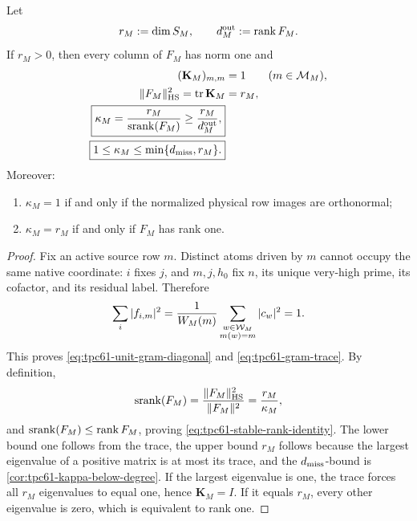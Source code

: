 \begin{theorem}
\label{thm:tpc61-stable-rank}
Let
\begin{equation}
 r_M:=\dim S_M,
 \qquad
 d_M^{\rm out}:=\operatorname{rank} F_M.
 \label{eq:tpc61-active-dimensions}
\end{equation}
If \(r_M>0\), then every column of \(F_M\) has norm one and
\begin{align}
 (\mathbf K_M)_{m,m}&=1
 \qquad(m\in\mathcal M_M),
 \label{eq:tpc61-unit-gram-diagonal}\\
 \|F_M\|_{\rm HS}^2
 =\operatorname{tr}\mathbf K_M&=r_M,
 \label{eq:tpc61-gram-trace}\\
 \boxed{
 \kappa_M
 =\frac{r_M}{\operatorname{srank}(F_M)}
 \ge\frac{r_M}{d_M^{\rm out}},}
 \label{eq:tpc61-stable-rank-identity}\\
 \boxed{
 1\le\kappa_M\le\min\{d_{\rm miss},r_M\}.}
 \label{eq:tpc61-kappa-basic-range}
\end{align}
Moreover:
\begin{enumerate}[label=\textup{(\roman*)},leftmargin=3em]
 \item \(\kappa_M=1\) if and only if the normalized physical row images
       are orthonormal;
 \item \(\kappa_M=r_M\) if and only if \(F_M\) has rank one.
\end{enumerate}
\end{theorem}

\begin{proof}
Fix an active source row \(m\).  Distinct atoms driven by \(m\) cannot
occupy the same native coordinate: \(i\) fixes \(j\), and \(m,j,h_0\) fix
\(n\), its unique very-high prime, its cofactor, and its residual label.
Therefore
\[
 \sum_i|f_{i,m}|^2
 =\frac{1}{W_M(m)}
   \sum_{\substack{w\in\mathcal W_M\\m(w)=m}}|c_w|^2
 =1.
\]
This proves \eqref{eq:tpc61-unit-gram-diagonal} and
\eqref{eq:tpc61-gram-trace}.  By definition,
\[
 \operatorname{srank}(F_M)
 =\frac{\|F_M\|_{\rm HS}^2}{\|F_M\|^2}
 =\frac{r_M}{\kappa_M},
\]
and \(\operatorname{srank}(F_M)\le\operatorname{rank} F_M\), proving
\eqref{eq:tpc61-stable-rank-identity}.  The lower bound one follows from
the trace, the upper bound \(r_M\) follows because the largest eigenvalue
of a positive matrix is at most its trace, and the
\(d_{\rm miss}\)-bound is
\cref{cor:tpc61-kappa-below-degree}.  If the largest eigenvalue is one,
the trace forces all \(r_M\) eigenvalues to equal one, hence
\(\mathbf K_M=I\).  If it equals \(r_M\), every other eigenvalue is zero,
which is equivalent to rank one.
\end{proof}

